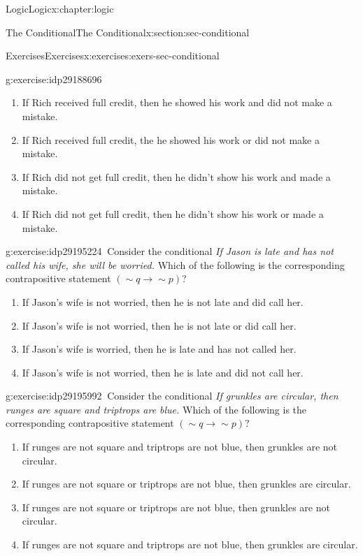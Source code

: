 \documentclass[twoside,10pt,]{book}
\numberwithin{equation}{section}
\newcommand{\contrapositive}{{\sim\!{q}{} {\rightarrow} \sim\!{p}{}}}
\begin{document}
\begin{chapterptx}{Logic}{}{Logic}{}{}{x:chapter:logic}
\begin{sectionptx}{The Conditional}{}{The Conditional}{}{}{x:section:sec-conditional}
\begin{exercises-subsection}{Exercises}{}{Exercises}{}{}{x:exercises:exers-sec-conditional}
\begin{divisionexercise}{34}{}{}{g:exercise:idp29188696}
\begin{enumerate}[label=(\alph*)]
\item{}If Rich received full credit, then he showed his work and did not make a mistake.%
\item{}If Rich received full credit, the he showed his work or did not make a mistake.%
\item{}If Rich did not get full credit, then he didn't show his work and made a mistake.%
\item{}If Rich did not get full credit, then he didn't show his work or made a mistake.%
\end{enumerate}
\end{divisionexercise}%
\begin{divisionexercise}{35}{}{}{g:exercise:idp29195224}%
\(\ \)Consider the conditional \emph{If Jason is late and has not called his wife, she will be worried.}  Which of the following is the corresponding contrapositive statement \((\contrapositive)\)? %
\begin{enumerate}[label=(\alph*)]
\item{}If Jason's wife is not worried, then he is not late and did call her.%
\item{}If Jason's wife is not worried, then he is not late or did call her.%
\item{}If Jason's wife is worried, then he is late and has not called her.%
\item{}If Jason's wife is not worried, then he is late and did not call her.%
\end{enumerate}
\end{divisionexercise}%
\begin{divisionexercise}{36}{}{}{g:exercise:idp29195992}%
\(\ \)Consider the conditional \emph{If grunkles are circular, then runges are square and triptrops are blue.}  Which of the following is the corresponding contrapositive statement \((\contrapositive)\)? %
\begin{enumerate}[label=(\alph*)]
\item{}If runges are not square and triptrops are not blue, then grunkles are not circular.%
\item{}If runges are not square or triptrops are not blue, then grunkles are circular.%
\item{}If runges are not square or triptrops are not blue, then grunkles are not circular.%
\item{}If runges are not square and triptrops are not blue, then grunkles are circular.%
\end{enumerate}

\end{divisionexercise}
\end{exercises-subsection}
\end{sectionptx}
\end{chapterptx}
\end{document}
